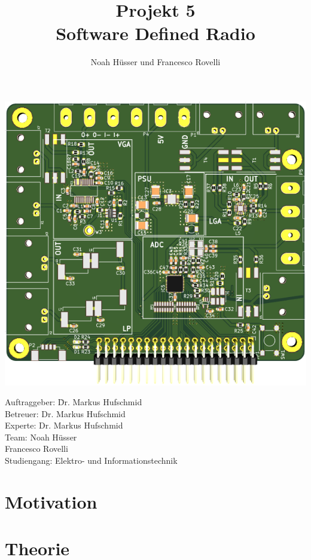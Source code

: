 \documentclass{fhnwreport} %
\title{%
  Projekt 5\\[2ex]
  Software Defined Radio}
\author{%
  Noah Hüsser und Francesco Rovelli}
\begin{document}
\maketitle

\vfill

\begin{minipage}{\textwidth}
\begin{center}
\vspace*{5ex}
    \includegraphics[height=0.4\textwidth]{data/images/title.png}
\end{center}
\end{minipage}

\vfill

\begin{tabbing}
Auftraggeber: \hspace{2em} \=  Dr. Markus Hufschmid \\[2ex]
Betreuer:  \>  Dr. Markus Hufschmid \\[2ex]
Experte:  \>  Dr. Markus Hufschmid \\[2ex]
Team:  \> Noah Hüsser \\ 
\> Francesco Rovelli \\[2ex]
Studiengang: \> Elektro- und Informationstechnik
\end{tabbing}


\hbox{}

\clearpage

\clearpage

\tableofcontents
\newpage

\section{Motivation}
\label{sec:motivation}


\newpage

\section{Theorie}
\label{sec:sdr}

\end{document}
